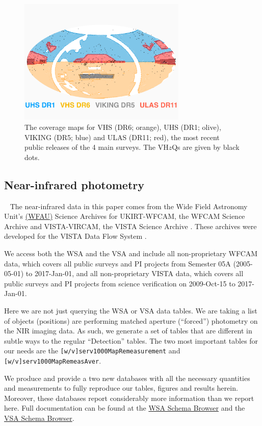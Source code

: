 \documentclass[usenatbib]{mnras}
\begin{document}
\begin{figure}
  \includegraphics[width=8.0cm, clip, trim=0mm 25mm 0mm 40mm]
  {../data/WSA_VSA/CoverageMaps_VHzQ_forpaper.pdf}
  \centering
  \caption[]
  {The coverage maps for VHS (DR6; orange), UHS (DR1; olive), VIKING (DR5; blue) and ULAS (DR11; red), the most recent public releases of the 4 main surveys. The VH$z$Qs are given by black dots.}
  \label{fig:coverage}
\end{figure}

\subsection{Near-infrared photometry}~\label{sec:NIR_data} 
The near-infrared data in this paper comes from the Wide Field
Astronomy Unit's \href{https://www.roe.ac.uk/ifa/wfau/}{(WFAU)}
Science Archives for UKIRT-WFCAM, the WFCAM Science Archive
\citep[WSA; ][]{Hambly2008} and VISTA-VIRCAM, the VISTA Science
Archive \citep[VSA; ][]{Cross2012}. These archives were developed for
the VISTA Data Flow System \citep[VDFS][]{VDFS}.

We access both the WSA and the VSA and include all non-proprietary
WFCAM data, which covers all public surveys and PI projects from
Semester 05A (2005-05-01) to 2017-Jan-01, and all non-proprietary VISTA data, which
covers all public surveys and PI projects from science verification on
2009-Oct-15 to 2017-Jan-01.

Here we are not just querying the WSA or VSA data tables. We are
taking a list of objects (positions) are performing matched aperture
(``forced'') photometry on the NIR imaging data. As such, we generate
a set of tables that are different in subtle ways to the regular
``Detection'' tables.  The two most important tables for our needs are
the {\tt [w/v]serv1000MapRemeasurement} and {\tt
[w/v]serv1000MapRemeasAver}.

We produce and provide a two new databases with all the necessary
quantities and measurements to fully reproduce our tables, figures and
results herein. Moreover, these databases report considerably more
information than we report here. Full documentation can be found at
the \href{http://wsa.roe.ac.uk/www/wsa_browser.html}{WSA Schema
Browser} and the
\href{http://horus.roe.ac.uk/vsa/www/vsa_browser.html}{VSA Schema
Browser}.
\end{document}
